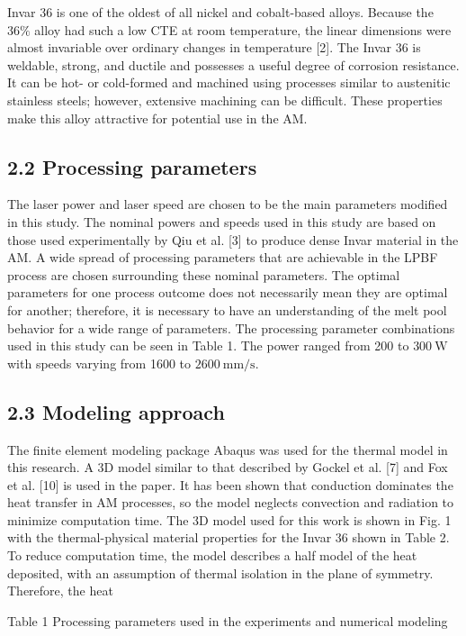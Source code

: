 \documentclass[10pt]{article}
\begin{document}
Invar 36 is one of the oldest of all nickel and cobalt-based alloys. Because the $36 \%$ alloy had such a low CTE at room temperature, the linear dimensions were almost invariable over ordinary changes in temperature [2]. The Invar 36 is weldable, strong, and ductile and possesses a useful degree of corrosion resistance. It can be hot- or cold-formed and machined using processes similar to austenitic stainless steels; however, extensive machining can be difficult. These properties make this alloy attractive for potential use in the AM.

\subsection*{2.2 Processing parameters}
The laser power and laser speed are chosen to be the main parameters modified in this study. The nominal powers and speeds used in this study are based on those used experimentally by Qiu et al. [3] to produce dense Invar material in the AM. A wide spread of processing parameters that are achievable in the LPBF process are chosen surrounding these nominal parameters. The optimal parameters for one process outcome does not necessarily mean they are optimal for another; therefore, it is necessary to have an understanding of the melt pool behavior for a wide range of parameters. The processing parameter combinations used in this study can be seen in Table 1. The power ranged from 200 to $300 \mathrm{~W}$ with speeds varying from 1600 to $2600 \mathrm{~mm} / \mathrm{s}$.

\subsection*{2.3 Modeling approach}
The finite element modeling package Abaqus was used for the thermal model in this research. A 3D model similar to that described by Gockel et al. [7] and Fox et al. [10] is used in the paper. It has been shown that conduction dominates the heat transfer in AM processes, so the model neglects convection and radiation to minimize computation time. The 3D model used for this work is shown in Fig. 1 with the thermal-physical material properties for the Invar 36 shown in Table 2. To reduce computation time, the model describes a half model of the heat deposited, with an assumption of thermal isolation in the plane of symmetry. Therefore, the heat

Table 1 Processing parameters used in the experiments and numerical modeling
\end{document}
